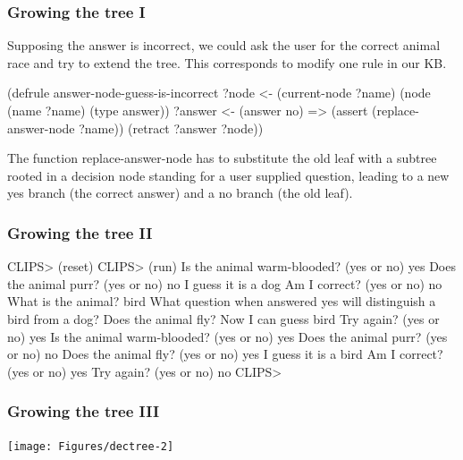 \documentclass[xcolor={usenames,dvipsnames,svgnames}, compress]{beamer}
\begin{document}
\begin{frame}[fragile]
  \frametitle{Growing the tree I}
  Supposing the answer is incorrect, we could ask the user for the
  correct animal race and try to extend the tree. This corresponds to
  modify one rule in our KB.
  \begin{clips-code}[numbers=none]
    (defrule answer-node-guess-is-incorrect
        ?node <- (current-node ?name)
        (node (name ?name) (type answer))
        ?answer <- (answer no)
        =>
        (assert (replace-answer-node ?name))
        (retract ?answer ?node))
  \end{clips-code}
  The function \textsf{replace-answer-node} has to substitute the old
  leaf with a subtree rooted in a decision node standing for a user
  supplied question, leading to a new yes branch (the correct answer)
  and a no branch (the old leaf).
      
\end{frame}

\begin{frame}[fragile]
  \frametitle{Growing the tree II}
  
  \begin{clips-code}
    CLIPS> (reset)
    CLIPS> (run)
    Is the animal warm-blooded? (yes or no) yes
    Does the animal purr? (yes or no) no
    I guess it is a dog
    Am I correct? (yes or no) no
    What is the animal? bird
    What question when answered yes will distinguish 
    a bird from a dog? Does the animal fly?
    Now I can guess bird
    Try again? (yes or no) yes
    Is the animal warm-blooded? (yes or no) yes
    Does the animal purr? (yes or no) no
    Does the animal fly? (yes or no) yes
    I guess it is a bird
    Am I correct? (yes or no) yes
    Try again? (yes or no) no
    CLIPS> 
  \end{clips-code}
  
\end{frame}

\begin{frame}
  \frametitle{Growing the tree III}
  \begin{center}
    \texttt{[image: Figures/dectree-2]}
  \end{center}
\end{frame}
\end{document}
